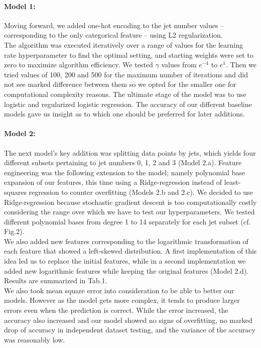 \documentclass[10pt,a4paper]{article}
\begin{document}
\paragraph{Model 1:}Moving forward, we added one-hot encoding to the jet number values -- corresponding to the only categorical feature -- using L2 regularization. \\
\indent The algorithm was executed iteratively over a range of values for the learning rate hyperparameter to find the optimal setting, and starting weights were set to zero to maximize algorithm efficiency. We tested $\gamma$ values from $e^{-4}$ to $e^{1}$. Then we tried values of 100, 200 and 500 for the maximum number of iterations and did not see marked difference between them so we opted for the smaller one for computational complexity reasons. The ultimate stage of the model was to use logistic and regularized logistic regression. The accuracy of our different baseline models gave us insight as to which one should be preferred for later additions.

\paragraph{Model 2:}The next model's key addition was splitting data points by jets, which yields four different subsets pertaining to jet numbers 0, 1, 2 and 3 (Model 2.a). Feature engineering was the following extension to the model; namely polynomial base expansion of our features, this time using a Ridge-regression instead of least-squares regression to counter overfitting (Models 2.b and 2.c). We decided to use Ridge-regression because stochastic gradient descent is too computationally costly considering the range over which we have to test our hyperparameters. We tested different polynomial bases from degree 1 to 14 separately for each jet subset (cf. Fig.2).\\
\indent We also added new features corresponding to the logarithmic transformation of each feature that showed a left-skewed distribution. A first implementation of this idea led us to replace the initial features, while in a second implementation we added new logarithmic features while keeping the original features (Model 2.d). Results are summarized in Tab.1.\\
\indent We also took mean square error into consideration to be able to better our models. However as the model gets more complex, it tends to produce larger errors even when the prediction is correct. While the error increased, the accuracy also increased and our model showed no signs of overfitting, no marked drop of accuracy in independent dataset testing, and the variance of the accuracy was reasonably low.
\end{document}
